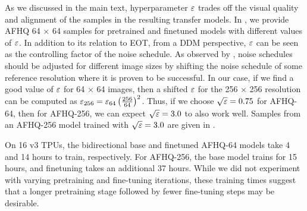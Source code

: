 \documentclass{article}
\begin{document}
As we discussed in the main text, hyperparameter $\varepsilon$ trades off the visual quality and alignment of the samples in the resulting transfer models. In , we provide AFHQ 64 $\times$ 64 samples for pretrained and finetuned models with different values of $\varepsilon$. In addition to its relation to EOT, from a DDM perspective, $\varepsilon$ can be seen as the controlling factor of the noise schedule. As observed by \cite{hoogeboom2023simple}, noise schedules should be adjusted for different image sizes by shifting the noise schedule of some reference resolution where it is proven to be successful.  
In our case, if we find a good value of $\varepsilon$ for 64 $\times$ 64 images, then a shifted $\varepsilon$ for the 256 $\times$ 256 resolution can be computed as  $\varepsilon_{256} = \varepsilon_{64} \left(\frac{256}{64} \right)^2$. Thus, if we choose $\sqrt{\varepsilon}=0.75$ for AFHQ-64, then for AFHQ-256, we can expect $\sqrt{\varepsilon} = 3.0$ to also work well. Samples from an AFHQ-256 model trained with $\sqrt{\varepsilon} = 3.0$ are given in .

On 16 v3 TPUs, the bidirectional base and finetuned AFHQ-64 models take 4 and 14 hours to train, respectively. For AFHQ-256, the base model trains for 15 hours, and finetuning takes an additional 37 hours. While we did not experiment with varying pretraining and fine-tuning iterations, these training times suggest that a longer pretraining stage followed by fewer fine-tuning steps may be desirable.
\end{document}
